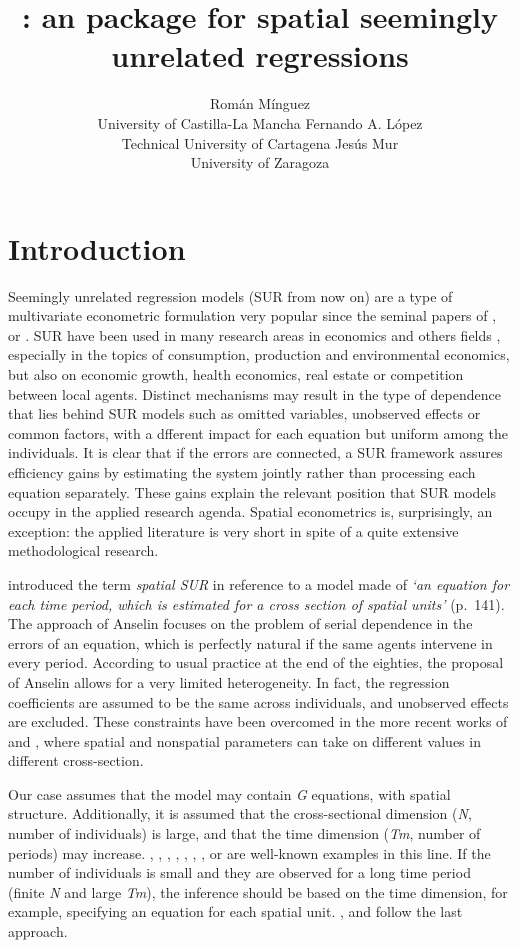\documentclass[article]{jss}
\author{
Román Mínguez\\University of Castilla-La Mancha \AND Fernando A. López\\Technical University of Cartagena \And Jesús Mur\\University of Zaragoza
}
\title{\pkg{spsur}: an \proglang{R} package for spatial seemingly unrelated regressions}
\begin{document}
\hypertarget{introduction}{%
\section{Introduction}\label{introduction}}

Seemingly unrelated regression models (SUR from now on) are a type of multivariate econometric formulation very popular since the seminal papers of \citet{Zellner1962}, \citet{Malinvaud1970} or \citet{Theil1971}. SUR have been used in many research areas in economics and others fields \citep[for instance, see][]{Fiebig2007}, especially in the topics of consumption, production and environmental economics, but also on economic growth, health economics, real estate or competition between local agents. Distinct mechanisms may result in the type of dependence that lies behind SUR models such as omitted variables, unobserved effects or common factors, with a dfferent impact for each equation but uniform among the individuals. It is clear that if the errors are connected, a SUR framework assures efficiency gains by estimating the system jointly rather than processing each equation separately. These gains explain the relevant position that SUR models occupy in the applied research agenda. Spatial econometrics is, surprisingly, an exception: the applied literature is very short in spite of a quite extensive methodological research.

\citet{Anselin1988a} introduced the term \emph{spatial SUR} in reference to a model made of \emph{`an equation for each time period, which is estimated for a cross section of spatial units'} (p.~141). The approach of Anselin focuses on the problem of serial dependence in the errors of an equation, which is perfectly natural if the same agents intervene in every period. According to usual practice at the end of the eighties, the proposal of Anselin allows for a very limited heterogeneity. In fact, the regression coefficients are assumed to be the same across individuals, and unobserved effects are excluded. These constraints have been overcomed in the more recent works of \citet{Mur2010} and \citet{Anselin2016}, where spatial and nonspatial parameters can take on different values in different cross-section.

Our case assumes that the model may contain \emph{G} equations, with spatial structure. Additionally, it is assumed that the cross-sectional dimension (\emph{N}, number of individuals) is large, and that the time dimension (\emph{Tm}, number of periods) may increase. \citet{Rey1999}, \citet{Egger2004}, \citet{LeGallo2006}, \citet{Fingleton2007}, \citet{Moscone2007}, \citet{LeGallo2008}, \citet{Lauridsen2010}, \citet{Kakamu2012} or \citet{Bech2012} are well-known examples in this line. If the number of individuals is small and they are observed for a long time period (finite \emph{N} and large \emph{Tm}), the inference should be based on the time dimension, for example, specifying an equation for each spatial unit. \citet{Arora1977}, \citet{Hordijk1977} and \citet{White1982} follow the last approach.
\end{document}
